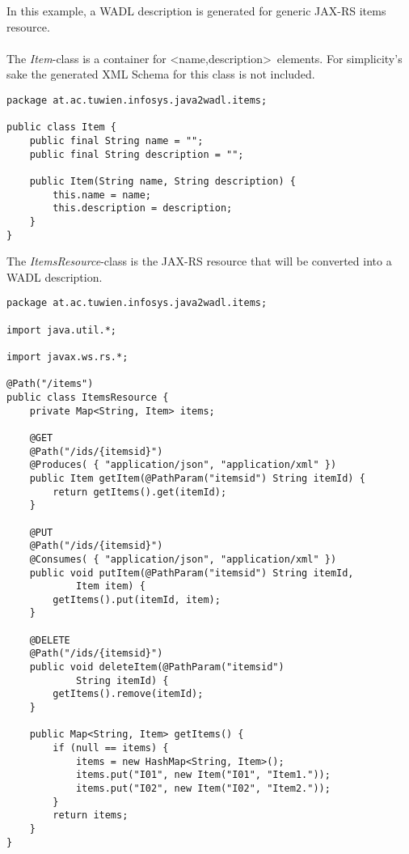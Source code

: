 In this example, a WADL description is generated for generic JAX-RS items resource.
\\ \\
The \emph{Item}-class is a container for \textless name,description\textgreater\ elements. For simplicity's sake the generated XML Schema for this class is not included.
\begin{lstlisting}
package at.ac.tuwien.infosys.java2wadl.items;

public class Item {
	public final String name = "";
	public final String description = "";
	
	public Item(String name, String description) {
		this.name = name;
		this.description = description;
	}
}
\end{lstlisting}
The \emph{ItemsResource}-class is the JAX-RS resource that will be converted into a WADL description.

\begin{lstlisting}
package at.ac.tuwien.infosys.java2wadl.items;

import java.util.*;

import javax.ws.rs.*;

@Path("/items")
public class ItemsResource {
	private Map<String, Item> items;

	@GET 
	@Path("/ids/{itemsid}")
	@Produces( { "application/json", "application/xml" })
	public Item getItem(@PathParam("itemsid") String itemId) {
		return getItems().get(itemId);
	}

	@PUT 
	@Path("/ids/{itemsid}")
	@Consumes( { "application/json", "application/xml" })
	public void putItem(@PathParam("itemsid") String itemId, 
			Item item) {
		getItems().put(itemId, item);
	}

	@DELETE 
	@Path("/ids/{itemsid}")
	public void deleteItem(@PathParam("itemsid") 
			String itemId) {
		getItems().remove(itemId);
	}

	public Map<String, Item> getItems() {
		if (null == items) {
			items = new HashMap<String, Item>();
			items.put("I01", new Item("I01", "Item1."));
			items.put("I02", new Item("I02", "Item2."));
		}
		return items;
	}
}
\end{lstlisting}

